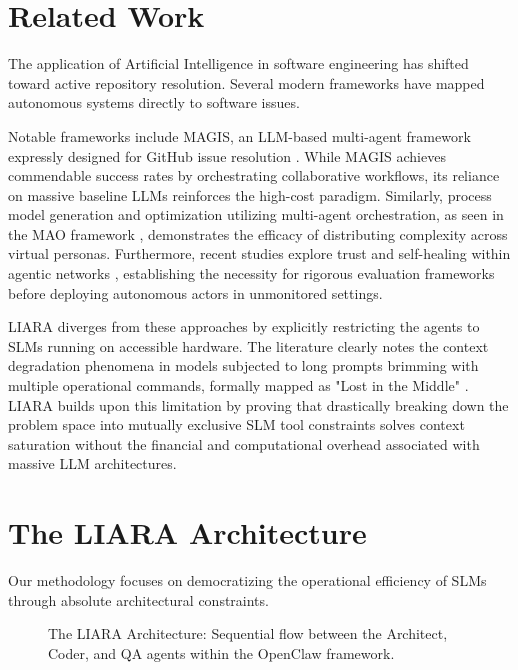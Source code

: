 \documentclass[10pt,journal,compsoc]{IEEEtran}
\begin{document}
\section{Related Work}
\label{sec:related}
The application of Artificial Intelligence in software engineering has shifted toward active repository resolution. Several modern frameworks have mapped autonomous systems directly to software issues. 

Notable frameworks include MAGIS, an LLM-based multi-agent framework expressly designed for GitHub issue resolution \cite{y2024_4}. While MAGIS achieves commendable success rates by orchestrating collaborative workflows, its reliance on massive baseline LLMs reinforces the high-cost paradigm. Similarly, process model generation and optimization utilizing multi-agent orchestration, as seen in the MAO framework \cite{c2025_3}, demonstrates the efficacy of distributing complexity across virtual personas. Furthermore, recent studies explore trust and self-healing within agentic networks \cite{d2025_13, p2025_2}, establishing the necessity for rigorous evaluation frameworks before deploying autonomous actors in unmonitored settings.

LIARA diverges from these approaches by explicitly restricting the agents to SLMs running on accessible hardware. The literature clearly notes the context degradation phenomena in models subjected to long prompts brimming with multiple operational commands, formally mapped as "Lost in the Middle" \cite{liu2024lost}. LIARA builds upon this limitation by proving that drastically breaking down the problem space into mutually exclusive SLM tool constraints solves context saturation without the financial and computational overhead associated with massive LLM architectures.

\section{The LIARA Architecture}
\label{sec:methodology}
Our methodology focuses on democratizing the operational efficiency of SLMs through absolute architectural constraints. 

\begin{figure}[!t]
\centering
\caption{The LIARA Architecture: Sequential flow between the Architect, Coder, and QA agents within the OpenClaw framework.}
\label{fig_liara_sequence}
\end{figure}
\end{document}
